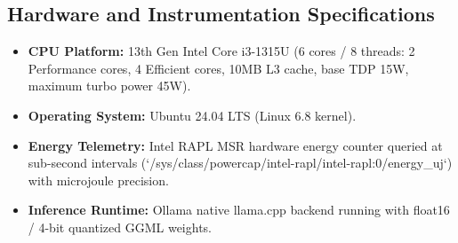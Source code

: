 \subsection{Hardware and Instrumentation Specifications}
\begin{itemize}[leftmargin=*]
    \item \textbf{CPU Platform:} 13th Gen Intel Core i3-1315U (6 cores / 8 threads: 2 Performance cores, 4 Efficient cores, 10MB L3 cache, base TDP 15W, maximum turbo power 45W).
    \item \textbf{Operating System:} Ubuntu 24.04 LTS (Linux 6.8 kernel).
    \item \textbf{Energy Telemetry:} Intel RAPL MSR hardware energy counter queried at sub-second intervals (`/sys/class/powercap/intel-rapl/intel-rapl:0/energy_uj`) with microjoule precision.
    \item \textbf{Inference Runtime:} Ollama native llama.cpp backend running with float16 / 4-bit quantized GGML weights.
\end{itemize}
